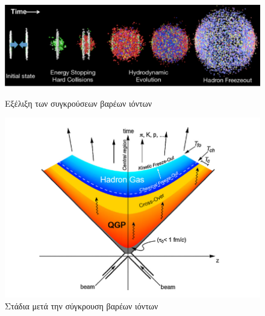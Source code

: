 	\begin{figure}[h!]
	    \centering
	    \begin{minipage}{.5\textwidth}
	        \centering
	        \includegraphics[scale=0.7]{STAR_Results/QGP_formation2}
	        \caption{Εξέλιξη των συγκρούσεων βαρέων ιόντων}
	        \label{fig4.1}
	    \end{minipage}%
	    \begin{minipage}{0.5\textwidth}
	        \centering
	        \includegraphics[scale=0.6]{STAR_Results/QGP_time_evolution}
	        \caption{Στάδια μετά την σύγκρουση βαρέων ιόντων}
	        \label{fig4.2}
	    \end{minipage}
	\end{figure}
	
